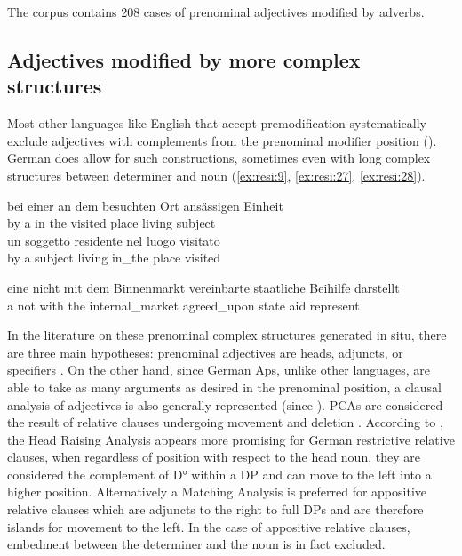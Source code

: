 \documentclass[output=paper,colorlinks,citecolor=brown]{langscibook}
\begin{document}
The corpus contains 208 cases of prenominal adjectives modified by adverbs.

\subsection{Adjectives modified by more complex structures}\label{sec:4.5}

Most other languages like English that accept premodification systematically exclude adjectives with complements from the prenominal modifier position (\citealt{SadlerArnold1994}). German does allow for such constructions, sometimes even with long complex structures between determiner and noun (\ref{ex:resi:9}, \ref{ex:resi:27}, \ref{ex:resi:28}).

\ea%
    \label{ex:resi:27}
\gll bei  einer  an  dem  besuchten  Ort  ansässigen  Einheit \\
     by  a       in  the  visited  place  living  subject  \\




  un  soggetto  residente  nel  luogo  visitato\\
       by                    a  subject  living  in\_the  place  visited\\
\z

\ea%
    \label{ex:resi:28}
\gll eine  nicht  mit  dem  Binnenmarkt  vereinbarte      staatliche  Beihilfe  darstellt      \\
     a      not  with  the  internal\_market  agreed\_upon state  aid  represent  \\
\z





In the literature on these prenominal complex structures generated in situ, there are three main hypotheses: prenominal adjectives are heads, adjuncts, or specifiers \citep{Roehrs2023}. On the other hand, since German Aps, unlike other languages, are able to take as many arguments as desired in the prenominal position, a clausal analysis of adjectives is also generally represented (since \citealt{Kayne1994}). PCAs are considered the result of relative clauses undergoing movement and deletion \citep{Cinque2010}. According to \citet{Resi2011}, the Head Raising Analysis appears more promising for German restrictive relative clauses, when regardless of position with respect to the head noun, they are considered the complement of D° within a DP and can move to the left into a higher position. Alternatively a Matching Analysis is preferred for appositive relative clauses which are adjuncts to the right to full DPs and are therefore islands for movement to the left. In the case of appositive relative clauses, embedment between the determiner and the noun is in fact excluded.
\end{document}
